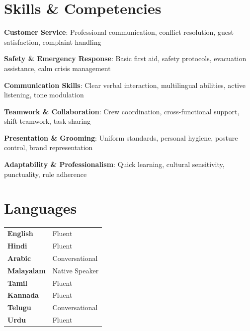 \documentclass[a4paper,11pt]{article}
\begin{document}
\section{Skills \& Competencies}
\begin{itemize}[leftmargin=0.15in, label={}, itemsep=0pt]
	\small{
		\item \textbf{Customer Service}: Professional communication, conflict resolution, guest satisfaction, complaint handling
		\item \textbf{Safety \& Emergency Response}: Basic first aid, safety protocols, evacuation assistance, calm crisis management
		\item \textbf{Communication Skills}: Clear verbal interaction, multilingual abilities, active listening, tone modulation
		\item \textbf{Teamwork \& Collaboration}: Crew coordination, cross-functional support, shift teamwork, task sharing
		\item \textbf{Presentation \& Grooming}: Uniform standards, personal hygiene, posture control, brand representation
		\item \textbf{Adaptability \& Professionalism}: Quick learning, cultural sensitivity, punctuality, rule adherence
	}
\end{itemize}

\section{Languages}
\begin{tabularx}{\textwidth}{X l}
\textbf{English}     & Fluent \\
\textbf{Hindi}       & Fluent \\
\textbf{Arabic}      & Conversational \\
\textbf{Malayalam}   & Native Speaker \\
\textbf{Tamil}       & Fluent \\
\textbf{Kannada}     & Fluent \\
\textbf{Telugu}      & Conversational \\
\textbf{Urdu}        & Fluent \\
\end{tabularx}
\end{document}
